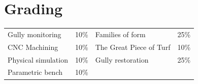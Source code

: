 \documentclass[11pt,article,oneside]{memoir}
\begin{document}
\section{Grading}
%
\begin{table}[H]
\begin{tabular}{l r @{\hskip 2cm} l @{\hskip 0.5cm} l}
%
Gully monitoring & 10\% & Families of form & 25\% \\
CNC Machining & 10\% & The Great Piece of Turf & 10\% \\
Physical simulation & 10\% & Gully restoration & 25\% \\
Parametric bench & 10\% \\
%
\end{tabular}
\end{table}

\clearpage

\end{document}

